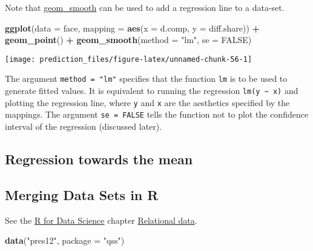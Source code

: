 \documentclass[]{book}
\newenvironment{Shaded}{\begin{snugshade}}{\end{snugshade}}
\newcommand{\KeywordTok}[1]{\textcolor[rgb]{0.13,0.29,0.53}{\textbf{#1}}}
\newcommand{\DataTypeTok}[1]{\textcolor[rgb]{0.13,0.29,0.53}{#1}}
\newcommand{\StringTok}[1]{\textcolor[rgb]{0.31,0.60,0.02}{#1}}
\newcommand{\OtherTok}[1]{\textcolor[rgb]{0.56,0.35,0.01}{#1}}
\newcommand{\OperatorTok}[1]{\textcolor[rgb]{0.81,0.36,0.00}{\textbf{#1}}}
\newcommand{\NormalTok}[1]{#1}
\theoremstyle{definition}
\theoremstyle{definition}
\theoremstyle{definition}
\theoremstyle{remark}
\begin{document}
Note that
\href{http://docs.ggplot2.org/current/geom_smooth.html}{geom\_smooth}
can be used to add a regression line to a data-set.

\begin{Shaded}
\begin{Highlighting}[]
\KeywordTok{ggplot}\NormalTok{(}\DataTypeTok{data =}\NormalTok{ face, }\DataTypeTok{mapping =} \KeywordTok{aes}\NormalTok{(}\DataTypeTok{x =}\NormalTok{ d.comp, }\DataTypeTok{y =}\NormalTok{ diff.share)) }\OperatorTok{+}
\StringTok{  }\KeywordTok{geom_point}\NormalTok{() }\OperatorTok{+}
\StringTok{  }\KeywordTok{geom_smooth}\NormalTok{(}\DataTypeTok{method =} \StringTok{"lm"}\NormalTok{, }\DataTypeTok{se =} \OtherTok{FALSE}\NormalTok{)}
\end{Highlighting}
\end{Shaded}

\begin{center}\texttt{[image: prediction\_files/figure-latex/unnamed-chunk-56-1]} \end{center}

The argument \texttt{method\ =\ "lm"} specifies that the function
\texttt{lm} is to be used to generate fitted values. It is equivalent to
running the regression \texttt{lm(y\ \textasciitilde{}\ x)} and plotting
the regression line, where \texttt{y} and \texttt{x} are the aesthetics
specified by the mappings. The argument \texttt{se\ =\ FALSE} tells the
function not to plot the confidence interval of the regression
(discussed later).

\subsection{Regression towards the
mean}\label{regression-towards-the-mean}

\subsection{Merging Data Sets in R}\label{merging-data-sets-in-r}

See the \href{http://r4ds.had.co.nz/}{R for Data Science} chapter
\href{http://r4ds.had.co.nz/relational-data.html}{Relational data}.

\begin{Shaded}
\begin{Highlighting}[]
\KeywordTok{data}\NormalTok{(}\StringTok{"pres12"}\NormalTok{, }\DataTypeTok{package =} \StringTok{"qss"}\NormalTok{)}
\end{Highlighting}
\end{Shaded}
\end{document}
